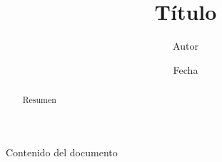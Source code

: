 \documentclass[a4paper,10pt]{article}
\title{Título}
\author{Autor}
\date{Fecha}
\begin{document}
\maketitle
\begin{abstract}
Resumen
\end{abstract}
\tableofcontents
Contenido del documento
\end{document}
